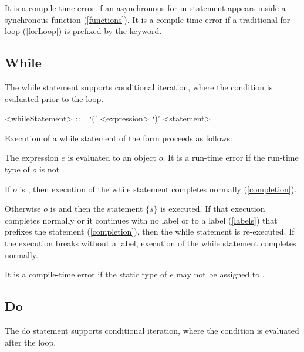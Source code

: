 \documentclass[makeidx]{article}
\begin{document}
{\LMHash{}%
It is a compile-time error if an asynchronous for-in statement appears inside a synchronous function (\ref{functions}).
It is a compile-time error if a traditional for loop (\ref{forLoop}) is prefixed by the \AWAIT{} keyword.



\subsection{While}

\LMHash{}%
The while statement supports conditional iteration, where the condition is evaluated prior to the loop.

\begin{grammar}
<whileStatement> ::= \WHILE{} `(' <expression> `)' <statement>
\end{grammar}

\LMHash{}%
Execution of a while statement of the form  proceeds as follows:

\LMHash{}%
The expression $e$ is evaluated to an object $o$.
It is a run-time error if the run-time type of $o$ is not .

\LMHash{}%
If $o$ is \FALSE{}, then execution of the while statement completes normally (\ref{completion}).

\LMHash{}%
Otherwise $o$ is \TRUE{} and then the statement $\{s\}$ is executed.
If that execution completes normally or it continues with no label or to a label (\ref{labels}) that prefixes the \WHILE{} statement (\ref{completion}), then the while statement is re-executed.
If the execution breaks without a label, execution of the while statement completes normally.

\LMHash{}%
It is a compile-time error if the static type of $e$ may not be assigned to .


\subsection{Do}

\LMHash{}%
The do statement supports conditional iteration, where the condition is evaluated after the loop.

}
\end{document}

